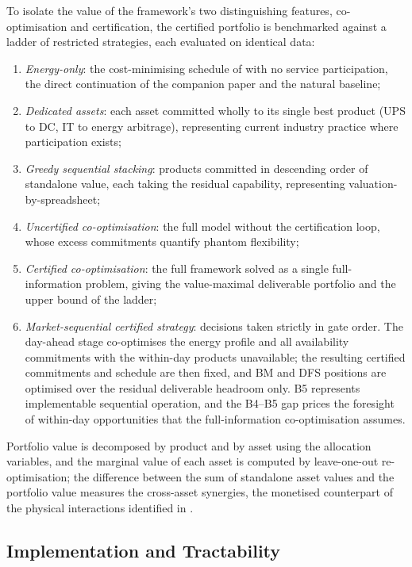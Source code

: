 \documentclass[lettersize,journal]{IEEEtran}
\begin{document}
To isolate the value of the framework's two distinguishing features, co-optimisation and certification, the certified portfolio is benchmarked against a ladder of restricted strategies, each evaluated on identical data:
\begin{enumerate}
    \item[B0.] \emph{Energy-only}: the cost-minimising schedule of \cite{takci2026characterisation} with no service participation, the direct continuation of the companion paper and the natural baseline;
    \item[B1.] \emph{Dedicated assets}: each asset committed wholly to its single best product (UPS to DC, IT to energy arbitrage), representing current industry practice where participation exists;
    \item[B2.] \emph{Greedy sequential stacking}: products committed in descending order of standalone value, each taking the residual capability, representing valuation-by-spreadsheet;
    \item[B3.] \emph{Uncertified co-optimisation}: the full model without the certification loop, whose excess commitments quantify phantom flexibility;
    \item[B4.] \emph{Certified co-optimisation}: the full framework solved as a single full-information problem, giving the value-maximal deliverable portfolio and the upper bound of the ladder;
    \item[B5.] \emph{Market-sequential certified strategy}: decisions taken strictly in gate order. The day-ahead stage co-optimises the energy profile and all availability commitments with the within-day products unavailable; the resulting certified commitments and schedule are then fixed, and BM and DFS positions are optimised over the residual deliverable headroom only. B5 represents implementable sequential operation, and the B4--B5 gap prices the foresight of within-day opportunities that the full-information co-optimisation assumes.
\end{enumerate}
Portfolio value is decomposed by product and by asset using the allocation variables, and the marginal value of each asset is computed by leave-one-out re-optimisation; the difference between the sum of standalone asset values and the portfolio value measures the cross-asset synergies, the monetised counterpart of the physical interactions identified in \cite{takci2026characterisation}.

\subsection{Implementation and Tractability}\label{sec:implementation}
\end{document}
